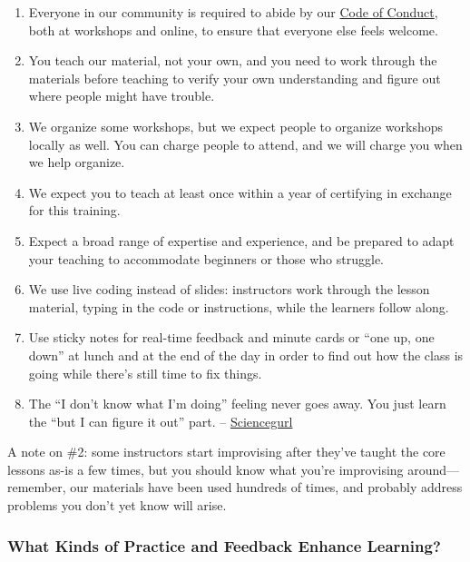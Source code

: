 \begin{enumerate}
\def\labelenumi{\arabic{enumi}.}
\itemsep1pt\parskip0pt
\item
  Everyone in our community is required to abide by our
  \href{\{\{\%20site.swc_site\%20\}\}/conduct/}{Code of Conduct}, both
  at workshops and online, to ensure that everyone else feels welcome.
\item
  You teach our material, not your own, and you need to work through the
  materials before teaching to verify your own understanding and figure
  out where people might have trouble.
\item
  We organize some workshops, but we expect people to organize workshops
  locally as well. You can charge people to attend, and we will charge
  you when we help organize.
\item
  We expect you to teach at least once within a year of certifying in
  exchange for this training.
\item
  Expect a broad range of expertise and experience, and be prepared to
  adapt your teaching to accommodate beginners or those who struggle.
\item
  We use live coding instead of slides: instructors work through the
  lesson material, typing in the code or instructions, while the
  learners follow along.
\item
  Use sticky notes for real-time feedback and minute cards or ``one up,
  one down'' at lunch and at the end of the day in order to find out how
  the class is going while there's still time to fix things.
\item
  The ``I don't know what I'm doing'' feeling never goes away. You just
  learn the ``but I can figure it out'' part. --
  \href{https://twitter.com/sciencegurlz0/status/687739023826235393}{Sciencegurl}
\end{enumerate}

A note on \#2: some instructors start improvising after they've taught
the core lessons as-is a few times, but you should know what you're
improvising around---remember, our materials have been used hundreds of
times, and probably address problems you don't yet know will arise.

\subsubsection{What Kinds of Practice and Feedback Enhance
Learning?}\label{what-kinds-of-practice-and-feedback-enhance-learning}

